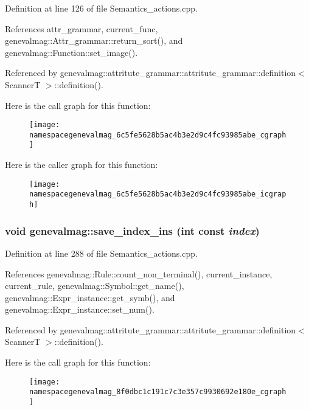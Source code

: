 Definition at line 126 of file Semantics\_\-actions.cpp.

References attr\_\-grammar, current\_\-func, genevalmag::Attr\_\-grammar::return\_\-sort(), and genevalmag::Function::set\_\-image().

Referenced by genevalmag::attritute\_\-grammar::attritute\_\-grammar::definition$<$ ScannerT $>$::definition().

Here is the call graph for this function:\nopagebreak
\begin{figure}[H]
\begin{center}
\leavevmode
\texttt{[image: namespacegenevalmag\_6c5fe5628b5ac4b3e2d9c4fc93985abe\_cgraph]}
\end{center}
\end{figure}


Here is the caller graph for this function:\nopagebreak
\begin{figure}[H]
\begin{center}
\leavevmode
\texttt{[image: namespacegenevalmag\_6c5fe5628b5ac4b3e2d9c4fc93985abe\_icgraph]}
\end{center}
\end{figure}
\hypertarget{namespacegenevalmag_8f0dbc1c191c7c3e357c9930692e180e}{
\subsubsection[{save\_\-index\_\-ins}]{\setlength{\rightskip}{0pt plus 5cm}void genevalmag::save\_\-index\_\-ins (int const  {\em index})}}
\label{namespacegenevalmag_8f0dbc1c191c7c3e357c9930692e180e}




Definition at line 288 of file Semantics\_\-actions.cpp.

References genevalmag::Rule::count\_\-non\_\-terminal(), current\_\-instance, current\_\-rule, genevalmag::Symbol::get\_\-name(), genevalmag::Expr\_\-instance::get\_\-symb(), and genevalmag::Expr\_\-instance::set\_\-num().

Referenced by genevalmag::attritute\_\-grammar::attritute\_\-grammar::definition$<$ ScannerT $>$::definition().

Here is the call graph for this function:\nopagebreak
\begin{figure}[H]
\begin{center}
\leavevmode
\texttt{[image: namespacegenevalmag\_8f0dbc1c191c7c3e357c9930692e180e\_cgraph]}
\end{center}
\end{figure}


